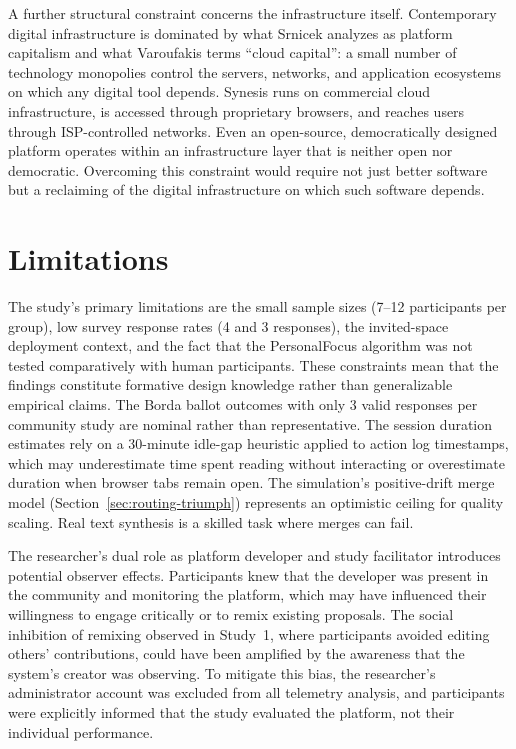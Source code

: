 \documentclass[a4paper, 12pt, twoside]{iviathesis}
\begin{document}
A further structural constraint concerns the infrastructure itself. Contemporary digital infrastructure is dominated by what Srnicek \cite{srnicek2017} analyzes as platform capitalism and what Varoufakis \cite{varoufakis2023technofeudalism} terms ``cloud capital'': a small number of technology monopolies control the servers, networks, and application ecosystems on which any digital tool depends. Synesis runs on commercial cloud infrastructure, is accessed through proprietary browsers, and reaches users through ISP-controlled networks. Even an open-source, democratically designed platform operates within an infrastructure layer that is neither open nor democratic. Overcoming this constraint would require not just better software but a reclaiming of the digital infrastructure on which such software depends.


\section{Limitations}
\label{sec:limitations}

The study's primary limitations are the small sample sizes (7--12 participants per group), low survey response rates (4 and 3 responses), the invited-space deployment context, and the fact that the PersonalFocus algorithm was not tested comparatively with human participants. These constraints mean that the findings constitute formative design knowledge rather than generalizable empirical claims. The Borda ballot outcomes with only 3 valid responses per community study are nominal rather than representative. The session duration estimates rely on a 30-minute idle-gap heuristic applied to action log timestamps, which may underestimate time spent reading without interacting or overestimate duration when browser tabs remain open. The simulation's positive-drift merge model (Section~\ref{sec:routing-triumph}) represents an optimistic ceiling for quality scaling. Real text synthesis is a skilled task where merges can fail.

The researcher's dual role as platform developer and study facilitator introduces potential observer effects. Participants knew that the developer was present in the community and monitoring the platform, which may have influenced their willingness to engage critically or to remix existing proposals. The social inhibition of remixing observed in Study~1, where participants avoided editing others' contributions, could have been amplified by the awareness that the system's creator was observing. To mitigate this bias, the researcher's administrator account was excluded from all telemetry analysis, and participants were explicitly informed that the study evaluated the platform, not their individual performance.
\end{document}

